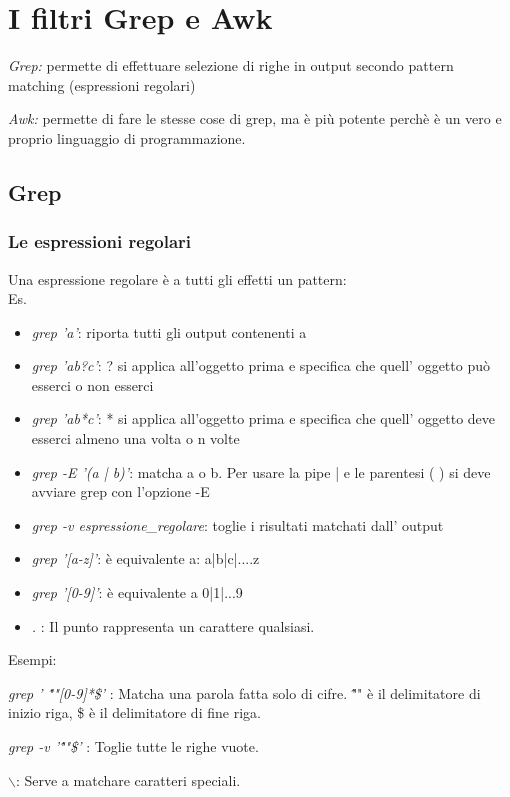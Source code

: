 \documentclass[a4paper,12pt]{article} %
\begin{document}
\section{I filtri Grep e Awk}
\begin{description}
\item \textit{Grep:} permette di effettuare selezione di righe in output secondo pattern matching (espressioni regolari)
\item \textit{Awk:} permette di fare le stesse cose di grep, ma è più potente perchè è un vero e proprio linguaggio di programmazione.
\subsection{Grep}
\subsubsection{Le espressioni regolari}
Una espressione regolare è a tutti gli effetti un pattern: \\
Es.\\
\begin{itemize}
\item \textit{grep 'a'}: riporta tutti gli output contenenti a
\item \textit{grep 'ab?c'}: ? si applica all'oggetto prima e specifica che quell' oggetto può esserci o non esserci
 \item \textit{grep 'ab*c'}: * si applica all'oggetto prima e specifica che quell' oggetto deve esserci almeno una volta o n volte
 \item \textit{grep -E '(a | b)'}: matcha a o b. Per usare la pipe | e le parentesi ( )  si deve avviare grep con l'opzione -E 
 \item \textit{grep -v espressione\_regolare}: toglie i risultati matchati dall' output
 \item \textit{grep '[a-z]'}: è equivalente a: a|b|c|....z
 \item \textit{grep '[0-9]'}: è equivalente a 0|1|...9
 \item \textit{. }: Il punto rappresenta un carattere qualsiasi.
\end{itemize}
Esempi:\\
\begin{description}
\item \textit{grep ' \^""[0-9]*\$'} : Matcha una parola fatta solo di cifre. \^"" è  il delimitatore di inizio riga, \$ è il delimitatore di fine riga.
\item \textit{grep -v '\^""\$'} : Toglie tutte le righe vuote.
\item \textit{$\backslash$}: Serve a matchare caratteri speciali.
\end{description}


\end{description}
\end{document}
